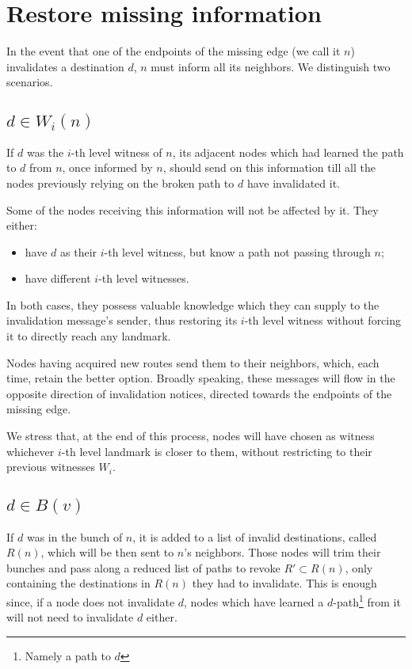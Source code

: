 \documentclass[a4paper,11pt,oneside]{report}
\begin{document}
\section{Restore missing information}
\label{sec.tz-restoration}
In the event that one of the endpoints of the missing edge (we call it $n$) invalidates a destination $d$, $n$ must inform all its neighbors. We distinguish two scenarios.

\subsection{$d \in W_i(n)$}
If $d$ was the $i$-th level witness of $n$, its adjacent nodes which had learned the path to $d$ from $n$, once informed by $n$, should send on this information till all the nodes previously relying on the broken path to $d$ have invalidated it.

Some of the nodes receiving this information will not be affected by it. They either:
\begin{itemize}
\item have $d$ as their $i$-th level witness, but know a path not passing through $n$;
\item have different $i$-th level witnesses.
\end{itemize}
In both cases, they possess valuable knowledge which they can supply to the invalidation message's sender, thus restoring its $i$-th level witness without forcing it to directly reach any landmark.

Nodes having acquired new routes send them to their neighbors, which, each time, retain the better option. Broadly speaking, these messages will flow in the opposite direction of invalidation notices, directed towards the endpoints of the missing edge.

We stress that, at the end of this process, nodes will have chosen as witness whichever $i$-th level landmark is closer to them, without restricting to their previous witnesses $W_i$.

\subsection{$d \in B(v)$}
If $d$ was in the bunch of $n$, it is added to a list of invalid destinations, called $R(n)$, which will be then sent to $n$'s neighbors. Those nodes will trim their bunches and pass along a reduced list of paths to revoke $R' \subset R(n)$, only containing the destinations in $R(n)$ they had to invalidate. This is enough since, if a node does not invalidate $d$, nodes which have learned a $d$-path\footnote{Namely a path to $d$} from it will not need to invalidate $d$ either.
\end{document}
